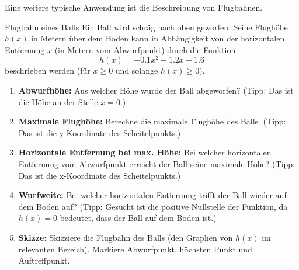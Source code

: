 Eine weitere typische Anwendung ist die Beschreibung von Flugbahnen.

\begin{aufgabenumgebung}{Flugbahn eines Balls}
Ein Ball wird schräg nach oben geworfen. Seine Flughöhe $h(x)$ in Metern über dem Boden kann in Abhängigkeit von der horizontalen Entfernung $x$ (in Metern vom Abwurfpunkt) durch die Funktion
\[ h(x) = -0.1x^2 + 1.2x + 1.6 \]
beschrieben werden (für $x \ge 0$ und solange $h(x) \ge 0$).
\begin{enumerate}
    \item \textbf{Abwurfhöhe:} Aus welcher Höhe wurde der Ball abgeworfen? (Tipp: Das ist die Höhe an der Stelle $x=0$.)
    \item \textbf{Maximale Flughöhe:} Berechne die maximale Flughöhe des Balls. (Tipp: Das ist die y-Koordinate des Scheitelpunkts.)
    \item \textbf{Horizontale Entfernung bei max. Höhe:} Bei welcher horizontalen Entfernung vom Abwurfpunkt erreicht der Ball seine maximale Höhe? (Tipp: Das ist die x-Koordinate des Scheitelpunkts.)
    \item \textbf{Wurfweite:} Bei welcher horizontalen Entfernung trifft der Ball wieder auf dem Boden auf? (Tipp: Gesucht ist die positive Nullstelle der Funktion, da $h(x)=0$ bedeutet, dass der Ball auf dem Boden ist.)
    \item \textbf{Skizze:} Skizziere die Flugbahn des Balls (den Graphen von $h(x)$ im relevanten Bereich). Markiere Abwurfpunkt, höchsten Punkt und Auftreffpunkt.
\end{enumerate}
\end{aufgabenumgebung}


